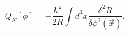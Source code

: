 \begin{equation}
Q_{K}[\phi]=-\frac{\hbar^{2}}{2R}\int d^{3}x\frac{\delta^{2}R}{\delta\phi
^{2}\left(  \vec{x}\right)  }.\label{7}%
\end{equation}

